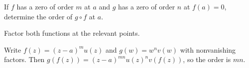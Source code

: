 \begin{exercise}\label{exr:iv07-expand-16}
If \(f\) has a zero of order \(m\) at \(a\) and \(g\) has a zero of order \(n\) at \(f(a)=0\), determine the order of \(g\circ f\) at \(a\).
\end{exercise}
\begin{hint}
Factor both functions at the relevant points.
\end{hint}
\begin{solution}
Write \(f(z)=(z-a)^m u(z)\) and \(g(w)=w^n v(w)\) with nonvanishing factors. Then \(g(f(z))=(z-a)^{mn}u(z)^n v(f(z))\), so the order is \(mn\).
\end{solution}

